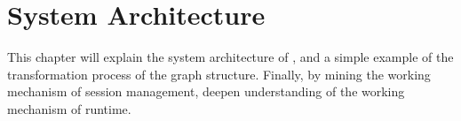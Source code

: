 \begin{savequote}[45mm]
\end{savequote}

\chapter{System Architecture} 
\label{ch:architecture}
\begin{content}
This chapter will explain the system architecture of \tf{}, and a simple example of the transformation process of the graph structure. Finally, by mining the working mechanism of session management, deepen understanding of the working mechanism of \tf{} runtime.
\end{content}


